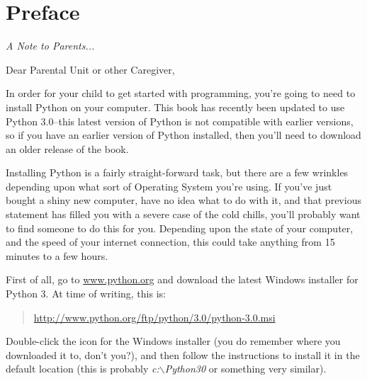 

\chapter*{Preface}\normalsize
\begin{center}
{\em A Note to Parents...}
\end{center}
\pagestyle{plain}

\noindent
Dear Parental Unit or other Caregiver,

In order for your child to get started with programming, you're going to need to install Python on your computer.  This book has recently been updated to use Python 3.0--this latest version of Python is not compatible with earlier versions, so if you have an earlier version of Python installed, then you'll need to download an older release of the book.

Installing Python is a fairly straight-forward task, but there are a few wrinkles depending upon what sort of Operating System you're using.  If you've just bought a shiny new computer, have no idea what to do with it, and that previous statement has filled you with a severe case of the cold chills, you'll probably want to find someone to do this for you.  Depending upon the state of your computer, and the speed of your internet connection, this could take anything from 15 minutes to a few hours.

\begin{WINDOWS}

\noindent
First of all, go to \href{http://www.python.org}{www.python.org} and download the latest Windows installer for Python 3.  At time of writing, this is:
\begin{quote}
     \href{http://www.python.org/ftp/python/3.0/python-3.0.msi}{http://www.python.org/ftp/python/3.0/python-3.0.msi}
\end{quote}
Double-click the icon for the Windows installer (you do remember where you downloaded it to, don't you?), and then follow the instructions to install it in the default location (this is probably \emph{c:$\backslash$Python30} or something very similar).

\end{WINDOWS}

